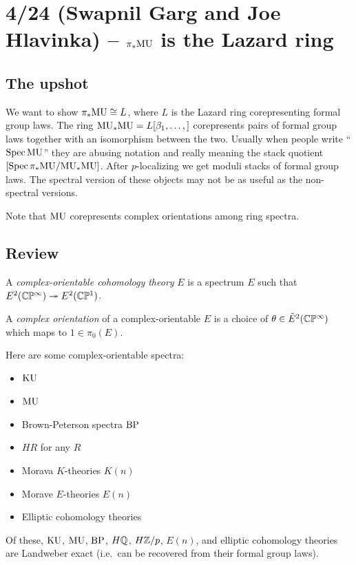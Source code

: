 \documentclass{article}
\begin{document}
\section{4/24 (Swapnil Garg and Joe Hlavinka) -- $\pi_* \mathrm{MU}$ is the Lazard ring}

\subsection{The upshot}

We want to show $\pi_* \mathrm{MU} \cong L$, where $L$ is the Lazard ring corepresenting formal group laws.
The ring $\mathrm{MU}_* \mathrm{MU} = L[\beta_1, \dots, ]$ corepresents pairs of formal group laws together with an isomorphism between the two.
Usually when people write ``$\operatorname{Spec} \mathrm{MU}$'' they are abusing notation and really meaning the stack quotient $[\operatorname{Spec} \pi_* \mathrm{MU} / \mathrm{MU}_* \mathrm{MU}]$.
After $p$-localizing we get moduli stacks of formal group laws.
The spectral version of these objects may not be as useful as the non-spectral versions.

Note that $\mathrm{MU}$ corepresents complex orientations among ring spectra.

\subsection{Review}

\begin{dfn}
	A \emph{complex-orientable cohomology theory} $E$ is a spectrum $E$ such that $E^2(\mathbb{C}\mathbb{P}^\infty) \twoheadrightarrow E^2(\mathbb{C}\mathbb{P}^1)$.
\end{dfn}

\begin{dfn}
	A \emph{complex orientation} of a complex-orientable $E$ is a choice of $\theta \in \tilde{E}^2(\mathbb{C}\mathbb{P}^\infty)$ which maps to $1 \in \pi_0(E)$.
\end{dfn}

\begin{ex}
	Here are some complex-orientable spectra:
	\begin{itemize}
		\item $\mathrm{KU}$
		\item $\mathrm{MU}$
		\item Brown-Peterson spectra $\mathrm{BP}$
		\item $HR$ for any $R$
		\item Morava $K$-theories $K(n)$
		\item Morave $E$-theories $E(n)$
		\item Elliptic cohomology theories
	\end{itemize}
	Of these, $\mathrm{KU}$, $\mathrm{MU}$, $\mathrm{BP}$, $H\mathbb{Q}$, $H\mathbb{Z}/p$, $E(n)$, and elliptic cohomology theories are Landweber exact (i.e.\ can be recovered from their formal group laws).
\end{ex}
\end{document}
